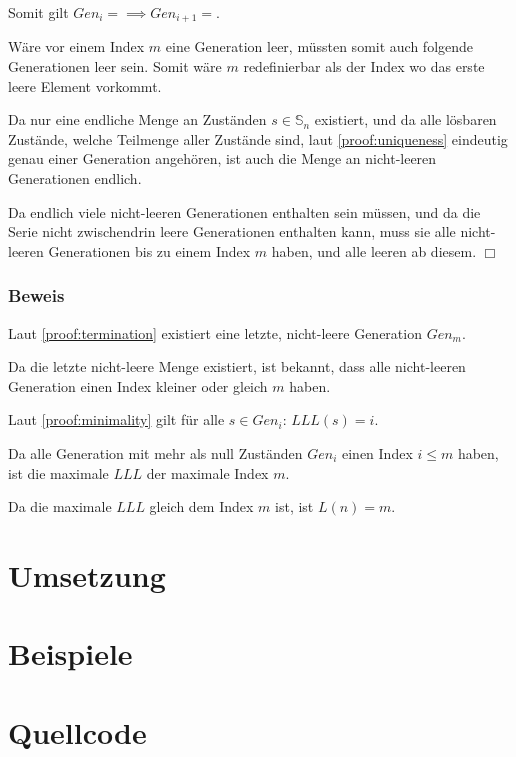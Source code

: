 \documentclass[a4paper,10pt,ngerman]{scrartcl}
\begin{document}
Somit gilt \(Gen_i = {} \implies Gen_{i+1} = {}\).

Wäre vor einem Index \(m\) eine Generation leer, müssten somit auch folgende Generationen leer sein. Somit wäre \(m\) redefinierbar als der Index wo das erste leere Element vorkommt.

Da nur eine endliche Menge an Zuständen \(s \in \mathbb{S}_n\) existiert, und da alle lösbaren Zustände, welche Teilmenge aller Zustände sind, laut \cref{proof:uniqueness} eindeutig genau einer Generation angehören, ist auch die Menge an nicht-leeren Generationen endlich.

Da endlich viele nicht-leeren Generationen enthalten sein müssen, und da die Serie nicht zwischendrin leere Generationen enthalten kann, muss sie alle nicht-leeren Generationen bis zu einem Index \(m\) haben, und alle leeren ab diesem. \(\Box\)

\subsubsection{Beweis}

Laut \cref{proof:termination} existiert eine letzte, nicht-leere Generation \(Gen_m\).

Da die letzte nicht-leere Menge existiert, ist bekannt, dass alle nicht-leeren Generation einen Index kleiner oder gleich \(m\) haben.

Laut \cref{proof:minimality} gilt für alle \(s \in Gen_i\): \(LLL(s) = i\).

Da alle Generation mit mehr als null Zuständen \(Gen_i\) einen Index \(i \leq m\) haben, ist die maximale \(LLL\) der maximale Index \(m\).

Da die maximale \(LLL\) gleich dem Index \(m\) ist, ist \(L(n) = m\).

\section{Umsetzung}

\section{Beispiele}


\section{Quellcode}

\end{document}
